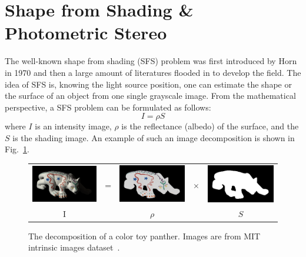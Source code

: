 \section{Shape from Shading \& Photometric Stereo}

The well-known shape from shading (SFS) problem was first introduced by Horn~\cite{horn1970shape} in 1970 and then a large amount of literatures flooded in to develop the field.
The idea of SFS is, knowing the light source position, one can estimate the shape or the surface of an object from one single grayscale image.
From the mathematical perspective, a SFS problem can be formulated as follows:
\begin{equation}\label{eq:sfs_equation}
    I = \rho S
\end{equation}
where $I$ is an intensity image, $\rho$ is the reflectance (albedo) of the surface, and the $S$ is the shading image. 
An example of such an image decomposition is shown in Fig.~\ref{fig:shading}.
\begin{figure}[!htbp]
\centering
\setlength{\tabcolsep}{0.1em} %
 {\renewcommand{\arraystretch}{0.6}%
\begin{tabular}{c c c c c}
   \includegraphics[height = 0.16\linewidth]{figures/panther_rgb.png} \hspace{0.05cm}   &
   \multirow{-10}{*}{\parbox[t]{3.5mm}{=}}  & 
   \includegraphics[height = 0.16\linewidth]{figures/panther_rho.png} &
    \multirow{-10}{*}{\parbox[t]{3.5mm}{$\times$}}  & 
   \includegraphics[height = 0.16\linewidth]{figures/panther_shade.png} \\
      {I} &{} &{$\rho$} & {}& {$S$}            
 \end{tabular}}
\caption{The decomposition of a color toy panther. Images are from MIT intrinsic images dataset~\cite{grosse2009ground}.}
\label{fig:shading}
\end{figure}

